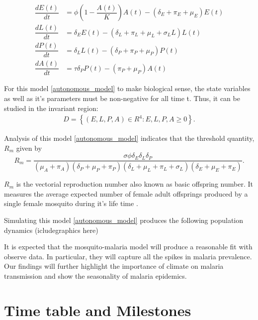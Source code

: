 \documentclass[12pt,a4paper,titlepage]{article}
\begin{document}
\begin{subequations}
	\label{autonomous_model}
	\begin{align}
		\dfrac{dE(t)}{dt} &= \phi\left(1-\dfrac{A(t)}{K}\right)A(t) - \left( \delta_E  + \pi_E+ \mu_E\right)E(t)\\
		\dfrac{dL(t)}{dt} &= \delta_EE(t) - \left( \delta_L  + \pi_L+ \mu_L + \sigma_L L\right)L(t)\\
		\dfrac{dP(t)}{dt} &= \delta_LL(t) - \left( \delta_P  + \pi_P+ \mu_P \right)P(t)\\
		\dfrac{dA(t)}{dt} &= \tau \delta_PP(t) - \left( \pi_P+ \mu_P \right)A(t)
	\end{align}
\end{subequations}

For this model \ref{autonomous_model} to make biological sense, the state variables as well as it's parameters must be non-negative for all time t. Thus, it can be studied in the invariant region: 
\begin{align}
D = \left\{ (E, L, P, A) \in R^4 : E, L, P, A \geq 0 \right\}.
\end{align}

Analysis of this model \ref{autonomous_model} indicates that the threshold quantity, $R_m$ given by 
\begin{equation}
	\label{R_m}
	R_m = \frac{\sigma\phi\delta_E\delta_L\delta_P}{(\mu_A+\pi_A)(\delta_P+\mu_P+\pi_P)(\delta_L+\mu_L+\pi_L + \sigma_L)(\delta_E+\mu_E+\pi_E)}.
\end{equation}

$R_m$ is the vectorial reproduction number also known as basic offspring number. It measures the average expected number of female adult offsprings produced by a single female mosquito during it's life time \cite{abdelrazec2017mathematical, hamdan2020effect}. 


Simulating this model \ref{autonomous_model} produces the following population dynamics (icludegraphics here)


It is expected that the mosquito-malaria model will produce a reasonable fit with observe data. In particular, they will capture all the spikes in malaria prevalence. Our findings will further highlight the importance of climate on malaria transmission and show the seasonality of malaria epidemics. 



\section{Time table and Milestones}







\end{document}
